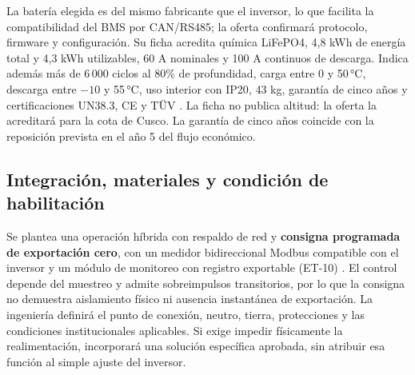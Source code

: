 La batería elegida es del mismo fabricante que el inversor, lo que facilita la compatibilidad del BMS por CAN/RS485; la oferta confirmará protocolo, firmware y configuración. Su ficha acredita química LiFePO4, 4,8 kWh de energía total y 4,3 kWh utilizables, 60 A nominales y 100 A continuos de descarga. Indica además más de 6\,000 ciclos al 80\% de profundidad, carga entre 0 y 50\,°C, descarga entre $-10$ y 55\,°C, uso interior con IP20, 43 kg, garantía de cinco años y certificaciones UN38.3, CE y TÜV \cite{tensitebat}. La ficha no publica altitud: la oferta la acreditará para la cota de Cusco. La garantía de cinco años coincide con la reposición prevista en el año 5 del flujo económico.

\subsection{Integración, materiales y condición de habilitación}
Se plantea una operación híbrida con respaldo de red y \textbf{consigna programada de exportación cero}, con un medidor bidireccional Modbus compatible con el inversor y un módulo de monitoreo con registro exportable (ET-10) \cite{autosolarmed}. El control depende del muestreo y admite sobreimpulsos transitorios, por lo que la consigna no demuestra aislamiento físico ni ausencia instantánea de exportación. La ingeniería definirá el punto de conexión, neutro, tierra, protecciones y las condiciones institucionales aplicables. Si exige impedir físicamente la realimentación, incorporará una solución específica aprobada, sin atribuir esa función al simple ajuste del inversor.

